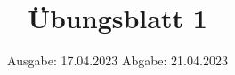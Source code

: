

\title{Übungsblatt 1}
\date{%
  Ausgabe: 17.04.2023 %
  \hspace{3em}
  Abgabe: 21.04.2023 %
}



\maketitle
\thispagestyle{empty}
\tableofcontents
\newpage







